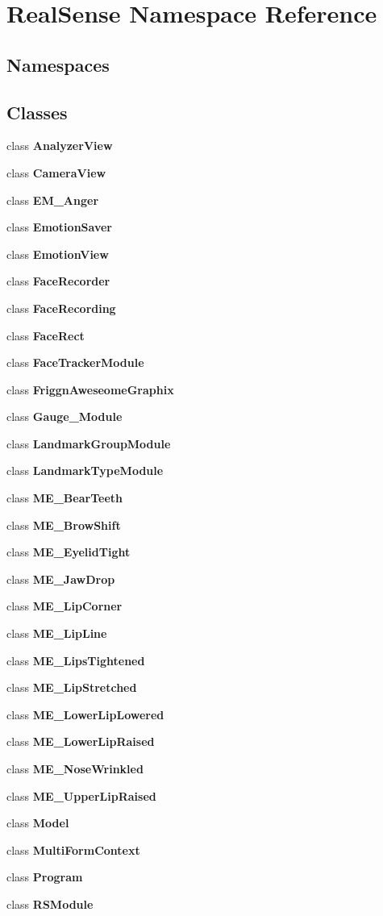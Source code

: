 \section{Real\+Sense Namespace Reference}
\label{namespace_real_sense}
\subsection*{Namespaces}
\begin{DoxyCompactItemize}
\end{DoxyCompactItemize}
\subsection*{Classes}
\begin{DoxyCompactItemize}
\item 
class \textbf{ Analyzer\+View}
\item 
class \textbf{ Camera\+View}
\item 
class \textbf{ E\+M\+\_\+\+Anger}
\item 
class \textbf{ Emotion\+Saver}
\item 
class \textbf{ Emotion\+View}
\item 
class \textbf{ Face\+Recorder}
\item 
class \textbf{ Face\+Recording}
\item 
class \textbf{ Face\+Rect}
\item 
class \textbf{ Face\+Tracker\+Module}
\item 
class \textbf{ Friggn\+Aweseome\+Graphix}
\item 
class \textbf{ Gauge\+\_\+\+Module}
\item 
class \textbf{ Landmark\+Group\+Module}
\item 
class \textbf{ Landmark\+Type\+Module}
\item 
class \textbf{ M\+E\+\_\+\+Bear\+Teeth}
\item 
class \textbf{ M\+E\+\_\+\+Brow\+Shift}
\item 
class \textbf{ M\+E\+\_\+\+Eyelid\+Tight}
\item 
class \textbf{ M\+E\+\_\+\+Jaw\+Drop}
\item 
class \textbf{ M\+E\+\_\+\+Lip\+Corner}
\item 
class \textbf{ M\+E\+\_\+\+Lip\+Line}
\item 
class \textbf{ M\+E\+\_\+\+Lips\+Tightened}
\item 
class \textbf{ M\+E\+\_\+\+Lip\+Stretched}
\item 
class \textbf{ M\+E\+\_\+\+Lower\+Lip\+Lowered}
\item 
class \textbf{ M\+E\+\_\+\+Lower\+Lip\+Raised}
\item 
class \textbf{ M\+E\+\_\+\+Nose\+Wrinkled}
\item 
class \textbf{ M\+E\+\_\+\+Upper\+Lip\+Raised}
\item 
class \textbf{ Model}
\item 
class \textbf{ Multi\+Form\+Context}
\item 
class \textbf{ Program}
\item 
class \textbf{ R\+S\+Module}
\end{DoxyCompactItemize}


